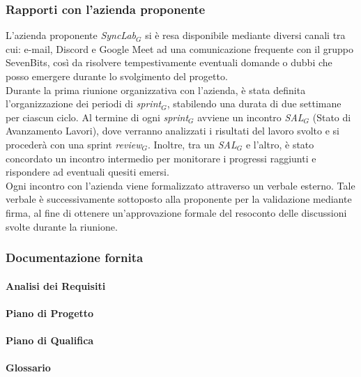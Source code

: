 \subsubsection{Rapporti con l'azienda proponente}
L'azienda proponente \textit{SyncLab}$_G$ si è resa disponibile mediante diversi canali tra cui: e-mail, Discord e Google Meet ad una comunicazione frequente con il gruppo SevenBits, così da risolvere tempestivamente eventuali domande o dubbi che posso emergere durante lo svolgimento del progetto. \\
Durante la prima riunione organizzativa con l'azienda, è stata definita l'organizzazione dei periodi di \textit{sprint}$_G$, stabilendo una durata di due settimane per ciascun ciclo. Al termine di ogni \textit{sprint}$_G$ avviene un incontro \textit{SAL}$_G$ (Stato di Avanzamento Lavori), dove verranno analizzati i risultati del lavoro svolto e si procederà con una sprint \textit{review}$_G$. Inoltre, tra un \textit{SAL}$_G$ e l'altro, è stato concordato un incontro intermedio per monitorare i progressi raggiunti e rispondere ad eventuali quesiti emersi.\\
Ogni incontro con l'azienda viene formalizzato attraverso un verbale esterno. Tale verbale è successivamente sottoposto alla proponente per la validazione mediante firma, al fine di ottenere un'approvazione formale del resoconto delle discussioni svolte durante la riunione.\\

\subsubsection{Documentazione fornita}
    \paragraph{Analisi dei Requisiti}

    \paragraph{Piano di Progetto}

    \paragraph{Piano di Qualifica}

    \paragraph{Glossario}

